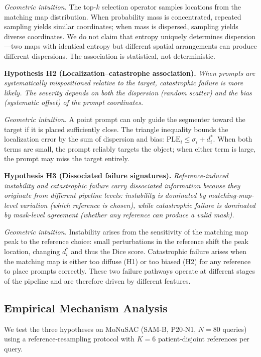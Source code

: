 \documentclass[10pt,twocolumn,letterpaper]{article}
\begin{document}
\noindent\textit{Geometric intuition.} The top-$k$ selection operator
samples locations from the matching map distribution. When probability mass
is concentrated, repeated sampling yields similar coordinates; when mass is
dispersed, sampling yields diverse coordinates. We do not claim that entropy
uniquely determines dispersion---two maps with identical entropy but
different spatial arrangements can produce different dispersions. The
association is statistical, not deterministic.

\medskip\noindent
\textbf{Hypothesis H2 (Localization--catastrophe association).}
\emph{When prompts are systematically mispositioned relative to the target,
catastrophic failure is more likely. The severity depends on both the
dispersion (random scatter) and the bias (systematic offset) of the prompt
coordinates.}

\noindent\textit{Geometric intuition.} A point prompt can only guide the
segmenter toward the target if it is placed sufficiently close. The
triangle inequality bounds the localization error by the sum of dispersion
and bias: $\text{PLE}_i \leq \sigma_i + d^*_i$. When both terms are small,
the prompt reliably targets the object; when either term is large, the
prompt may miss the target entirely.

\medskip\noindent
\textbf{Hypothesis H3 (Dissociated failure signatures).}
\emph{Reference-induced instability and catastrophic failure carry
dissociated information because they originate from different pipeline
levels: instability is dominated by matching-map-level variation (which
reference is chosen), while catastrophic failure is dominated by
mask-level agreement (whether any reference can produce a valid mask).}

\noindent\textit{Geometric intuition.} Instability arises from the
sensitivity of the matching map peak to the reference choice: small
perturbations in the reference shift the peak location, changing $d^*_i$ and
thus the Dice score. Catastrophic failure arises when the matching map is
either too diffuse (H1) or too biased (H2) for any reference to place
prompts correctly. These two failure pathways operate at different stages of
the pipeline and are therefore driven by different features.

\subsection{Empirical Mechanism Analysis}

We test the three hypotheses on MoNuSAC (SAM-B, P20-N1, $N=80$ queries)
using a reference-resampling protocol with $K=6$ patient-disjoint references
per query.
\end{document}

